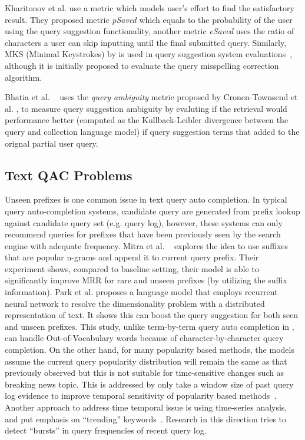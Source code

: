 \documentclass[12pt]{article} %
\begin{document}
Kharitonov et al. \cite{kharitonov_user_2013} use a metric which models user's effort to find the satisfactory result.
They proposed metric \textit{pSaved} which equals to the probability of the user using the query suggestion functionality, another metric \textit{eSaved} 
 uses the ratio of characters a user can skip inputting until the final submitted query.
Similarly,
MKS (Minimal Keystrokes) by \cite{duan_online_2011}
is used in query suggestion system evaluations~\cite{kharitonov_user_2013}, although it is initially proposed to evaluate the query misspelling correction algorithm.

Bhatia et al. ~\cite{bhatia_query_2011} uses the \textit{query ambiguity} metric proposed by Cronen-Townsend et al. \cite{predicting_2002}, to measure query suggestion ambiguity by evaluting if the retrieval would performance better (computed as the Kullback-Leibler divergence between the query and collection language model) if query suggestion terms that added to the orignal partial user query.


\subsection{Text QAC Problems}
Unseen prefixes is one common issue in text query auto completion.
In typical query auto-completion systems, candidate query are generated from prefix lookup against candidate query set (e.g. query log), however, these systems
 can only recommend queries for prefixes that have been previously seen by the search engine with adequate frequency.
Mitra et al. ~\cite{mitra_query_2015} explores the idea to use suffixes that are popular n-grams and append it to current query prefix.
Their experiment shows, compared to baseline setting, their model is able to significantly improve MRR for rare and unseen prefixes (by utilizing the suffix information).
%
Park et al. \cite{park_neural_2017} proposes a language model that employs  recurrent neural network to resolve the dimensionality problem with a distributed representation of text.
It shows this can boost the query suggestion for both seen and unseen prefixes.
This study, unlike term-by-term query auto completion in \cite{vargas_term-by-term_2016}, can handle Out-of-Vocabulary words because of character-by-character query completion.
On the other hand, for many popularity based methods, the models assume the current query popularity distribution will remain the same as that previously observed but this is not suitable for time-sensitive changes such as breaking news topic. This is addressed by only take a window size of past query log evidence to improve temporal sensitivity of popularity based methods~\cite{cai_survey_2016}.
Another approach to address time temporal issue is using time-series analysis, and put emphasis on ``trending'' keywords~\cite{shokouhi_detecting_2011}.
Research in this direction tries to detect ``bursts'' in query frequencies of recent query log.
\end{document}
